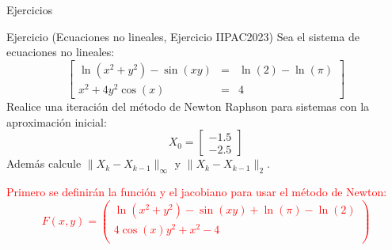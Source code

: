 \begin{frame}[fragile]{Ejercicios}
\begin{block}{Ejercicio (Ecuaciones no lineales, Ejercicio IIPAC2023)}
Sea el sistema de ecuaciones no lineales:
\begin{displaymath}
\begin{bmatrix}
\ln(x^2+y^2)-\sin(xy) &=& \ln(2)-\ln(\pi)\\
x^2+4y^2\cos(x) &=&4
\end{bmatrix}
\end{displaymath}
Realice una iteración del método de Newton Raphson para sistemas con la aproximación inicial:
\begin{displaymath}
X_0=\begin{bmatrix}
-1.5\\
-2.5
\end{bmatrix}
\end{displaymath}
Además calcule $\parallel X_k-X_{k-1}\parallel_{\infty}$ y $\parallel X_k-X_{k-1}\parallel_2$.
\end{block}\pause
\textcolor{red}{
Primero se definirán la función y el jacobiano para usar el método de Newton:
\small
\begin{displaymath}
F(x,y)=\begin{pmatrix}
\ln(x^2+y^2)-\sin(xy)+\ln(\pi)-\ln(2)\\
4\cos(x)y^2+x^2-4\\
\end{pmatrix}
\end{displaymath}
}
\end{frame}
